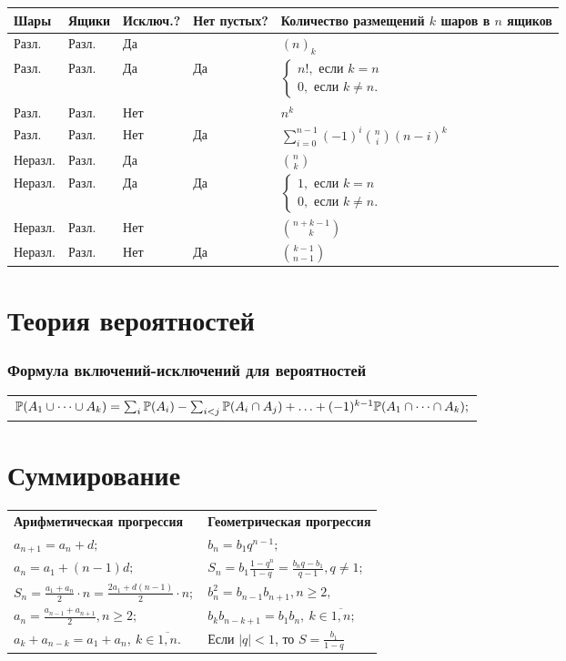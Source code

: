 \footnotesize
\begin{longtable}[c]{|B{0.14}{0}|B{0.14}{0}|B{0.15}{0}|B{0.17}{0}|B{0.40}{0}|}
\hline
Шары & Ящики & Исключ.? & Нет пустых? &Количество размещений $k$ шаров в $n$ ящиков \tabularnewline\hline
Разл. & Разл. & Да & & $\textstyle(n)_k$ \tabularnewline\hline
Разл. & Разл. & Да & Да & $\textstyle\begin{cases} n!, \text{ если } k=n \\ 0, \text{ если } k\ne n. \end{cases}$  \tabularnewline\hline
Разл. & Разл. & Нет &  & $\textstyle n^k$ \tabularnewline\hline
Разл. & Разл. & Нет & Да & $\textstyle\sum_{i=0}^{n-1}(-1)^{i} \binom{n}{i} (n-i)^k$ \tabularnewline\hline
Неразл. & Разл. & Да & & $\textstyle\binom{n}{k}$ \tabularnewline\hline
Неразл. & Разл. & Да & Да & $\textstyle\begin{cases} 1, \text{ если } k=n \\ 0, \text{ если } k\ne n. \end{cases}$ \tabularnewline\hline
Неразл. & Разл. & Нет & & $\textstyle\binom{n+k-1}{k}$ \tabularnewline\hline
Неразл. & Разл. & Нет & Да & $\textstyle\binom{k-1}{n-1}$ \tabularnewline\hline
\end{longtable}
\normalsize 

\section{Теория вероятностей}

\subsubsection{Формула включений-исключений для вероятностей}

\begin{longtable}[l]{l}
	$\mathbb{P}(A_1\cup\dots\cup A_k)= \sum_{i} \mathbb{P}(A_i) - \sum_{i<j} \mathbb{P}(A_i\cap A_j)+\ldots + (-1)^{k-1}\mathbb{P}(A_1\cap\dots\cap A_k);$
\end{longtable}

\section{Суммирование}
\begin{longtable}[l]{l l}
{\normalfont\small\sffamily\bfseries Арифметическая прогрессия}
&
{\normalfont\small\sffamily\bfseries Геометрическая прогрессия}
\\
$a_{n+1}=a_n+d;$ & $b_n=b_1 q^{n-1};$
\\
$a_n=a_1+(n-1)d;$ & $S_n=b_1\frac{1-q^n}{1-q}=\frac{b_n q-b_1}{q-1}, q\ne 1$;
\\ 
$S_n=\frac{a_1+a_n}{2}\cdot n=\frac{2a_1+d(n-1)}{2}\cdot n;$ & $b^2_n=b_{n-1}b_{n+1}, n\geq2,$
\\
$a_n=\frac{a_{n-1}+a_{n+1}}{2}, n\geq 2;$ & $b_kb_{n-k+1}=b_1b_n,\ k\in\overline{1,n};$
\\
$a_k+a_{n-k}=a_1+a_n,\ k\in\overline{1,n}.$ & Если $|q|<1$, то $S=\frac{b_1}{1-q}$
\end{longtable}

